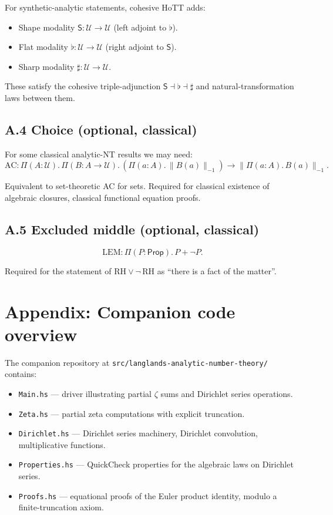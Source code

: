 \documentclass[12pt]{article}
\theoremstyle{definition}
\theoremstyle{remark}
\newcommand{\Prop}{\mathsf{Prop}}
\newcommand{\esh}{\mathsf{S}}      %
\begin{document}
For synthetic-analytic statements, cohesive HoTT
\cite{Shulman2018Cohesive} adds:
\begin{itemize}
\item Shape modality $\esh:\mathcal{U} \to \mathcal{U}$ (left adjoint to
$\flat$).
\item Flat modality $\flat:\mathcal{U} \to \mathcal{U}$ (right adjoint to
$\esh$).
\item Sharp modality $\sharp:\mathcal{U} \to \mathcal{U}$.
\end{itemize}

These satisfy the cohesive triple-adjunction $\esh \dashv \flat \dashv \sharp$
and natural-transformation laws between them.

\subsection*{A.4 Choice (optional, classical)}

For some classical analytic-NT results we may need:
\begin{equation}\label{eq:choice}
\mathrm{AC} : \Pi(A:\mathcal{U}).\, \Pi(B:A \to \mathcal{U}).\,
   (\Pi(a:A).\, \|B(a)\|_{-1}) \to \|\Pi(a:A).\, B(a)\|_{-1}.
\end{equation}

Equivalent to set-theoretic AC for sets. Required for classical existence
of algebraic closures, classical functional equation proofs.

\subsection*{A.5 Excluded middle (optional, classical)}

\begin{equation}\label{eq:lem}
\mathrm{LEM} : \Pi(P:\Prop).\, P + \neg P.
\end{equation}

Required for the statement of $\mathrm{RH} \vee \neg\,\mathrm{RH}$ as
``there is a fact of the matter''.

\section{Appendix: Companion code overview}\label{app:code}

The companion repository at \texttt{src/langlands-analytic-number-theory/}
contains:

\begin{itemize}
\item \texttt{Main.hs} --- driver illustrating partial $\zeta$ sums and
Dirichlet series operations.
\item \texttt{Zeta.hs} --- partial zeta computations with explicit
truncation.
\item \texttt{Dirichlet.hs} --- Dirichlet series machinery, Dirichlet
convolution, multiplicative functions.
\item \texttt{Properties.hs} --- QuickCheck properties for the algebraic
laws on Dirichlet series.
\item \texttt{Proofs.hs} --- equational proofs of the Euler product
identity, modulo a finite-truncation axiom.
\end{itemize}
\end{document}
